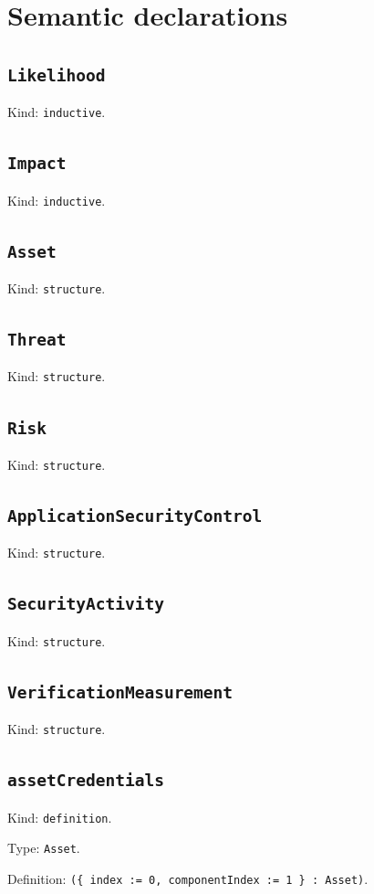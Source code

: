 \documentclass[11pt]{article}
\begin{document}
\section*{Semantic declarations}
\subsection*{\texttt{Likelihood}}
\noindent Kind: \texttt{inductive}.\par
\subsection*{\texttt{Impact}}
\noindent Kind: \texttt{inductive}.\par
\subsection*{\texttt{Asset}}
\noindent Kind: \texttt{structure}.\par
\subsection*{\texttt{Threat}}
\noindent Kind: \texttt{structure}.\par
\subsection*{\texttt{Risk}}
\noindent Kind: \texttt{structure}.\par
\subsection*{\texttt{ApplicationSecurityControl}}
\noindent Kind: \texttt{structure}.\par
\subsection*{\texttt{SecurityActivity}}
\noindent Kind: \texttt{structure}.\par
\subsection*{\texttt{VerificationMeasurement}}
\noindent Kind: \texttt{structure}.\par
\subsection*{\texttt{assetCredentials}}
\noindent Kind: \texttt{definition}.\par
\noindent Type: \texttt{Asset}.\par
\noindent Definition: \texttt{(\{ index := 0, componentIndex := 1 \} : Asset)}.\par
\end{document}
